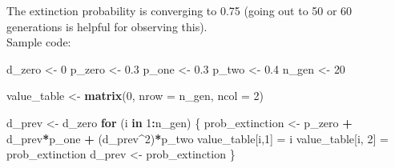 \documentclass[]{book}
\newenvironment{Shaded}{\begin{snugshade}}{\end{snugshade}}
\newcommand{\ControlFlowTok}[1]{\textcolor[rgb]{0.13,0.29,0.53}{\textbf{#1}}}
\newcommand{\DataTypeTok}[1]{\textcolor[rgb]{0.13,0.29,0.53}{#1}}
\newcommand{\DecValTok}[1]{\textcolor[rgb]{0.00,0.00,0.81}{#1}}
\newcommand{\FloatTok}[1]{\textcolor[rgb]{0.00,0.00,0.81}{#1}}
\newcommand{\KeywordTok}[1]{\textcolor[rgb]{0.13,0.29,0.53}{\textbf{#1}}}
\newcommand{\NormalTok}[1]{#1}
\newcommand{\OperatorTok}[1]{\textcolor[rgb]{0.81,0.36,0.00}{\textbf{#1}}}
\newcommand{\StringTok}[1]{\textcolor[rgb]{0.31,0.60,0.02}{#1}}
\begin{document}
The extinction probability is converging to 0.75 (going out to 50 or 60 generations is helpful for observing this).\\
Sample code:

\begin{Shaded}
\begin{Highlighting}[]
\NormalTok{d_zero <-}\StringTok{ }\DecValTok{0}
\NormalTok{p_zero <-}\StringTok{ }\FloatTok{0.3}
\NormalTok{p_one <-}\StringTok{ }\FloatTok{0.3}
\NormalTok{p_two <-}\StringTok{ }\FloatTok{0.4}
\NormalTok{n_gen <-}\StringTok{ }\DecValTok{20}

\NormalTok{value_table <-}\StringTok{ }\KeywordTok{matrix}\NormalTok{(}\DecValTok{0}\NormalTok{, }\DataTypeTok{nrow =}\NormalTok{ n_gen, }\DataTypeTok{ncol =} \DecValTok{2}\NormalTok{)}

\NormalTok{d_prev <-}\StringTok{ }\NormalTok{d_zero}
\ControlFlowTok{for}\NormalTok{ (i }\ControlFlowTok{in} \DecValTok{1}\OperatorTok{:}\NormalTok{n_gen) \{}
\NormalTok{  prob_extinction <-}\StringTok{ }\NormalTok{p_zero }\OperatorTok{+}\StringTok{ }\NormalTok{d_prev}\OperatorTok{*}\NormalTok{p_one }\OperatorTok{+}\StringTok{ }\NormalTok{(d_prev}\OperatorTok{^}\DecValTok{2}\NormalTok{)}\OperatorTok{*}\NormalTok{p_two}
\NormalTok{  value_table[i,}\DecValTok{1}\NormalTok{] =}\StringTok{ }\NormalTok{i}
\NormalTok{  value_table[i, }\DecValTok{2}\NormalTok{] =}\StringTok{ }\NormalTok{prob_extinction}
\NormalTok{  d_prev <-}\StringTok{ }\NormalTok{prob_extinction}
\NormalTok{\}}
\end{Highlighting}
\end{Shaded}
\end{document}
